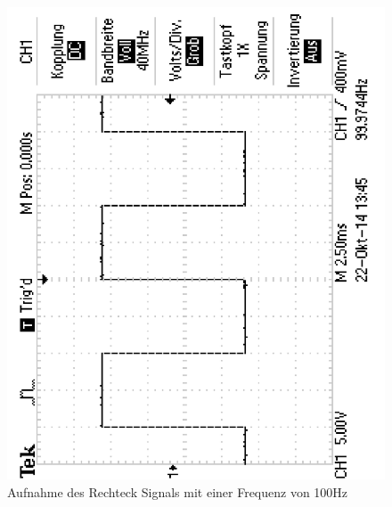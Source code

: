 \documentclass[12pt,a4paper]{article}
\begin{document}
\begin{figure}[H] 
  \centering
    \includegraphics[scale = 0.4, angle = -90]{2_1_rech_100hz.pdf}
  	\caption[Aufnahme des Rechtecksignals mit einer Frequenz von 100Hz]{Aufnahme des Rechteck Signals mit einer Frequenz von 100Hz}
  \label{fig:2_1_rech_100hz}
\end{figure}
\end{document}

